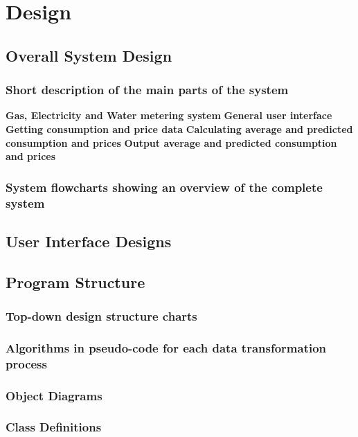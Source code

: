 \chapter{Design}

\section{Overall System Design}

\subsection{Short description of the main parts of the system}
\textbf{Gas, Electricity and Water metering system}
\textbf{General user interface}
\textbf{Getting consumption and price data}
\textbf{Calculating average and predicted consumption and prices}
\textbf{Output average and predicted consumption and prices}

\subsection{System flowcharts showing an overview of the complete system}

\section{User Interface Designs}

\section{Program Structure}

\subsection{Top-down design structure charts}

\subsection{Algorithms in pseudo-code for each data transformation process}

\subsection{Object Diagrams}

\subsection{Class Definitions}

